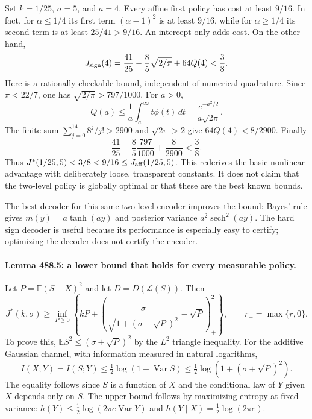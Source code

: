 \documentclass[11pt]{article}
\begin{document}
Set $k=1/25$, $\sigma=5$, and $a=4$. Every affine first policy has
cost at least $9/16$. In fact, for $\alpha\le1/4$ its first term
$(\alpha-1)^2$ is at least $9/16$, while for $\alpha\ge1/4$ its
second term is at least $25/41>9/16$. An intercept only adds cost.
On the other hand,
\[
 J_{\rm sign}(4)=\frac{41}{25}-\frac85\sqrt{2/\pi}+64Q(4)
                                      <\frac38.
\]
Here is a rationally checkable bound, independent of numerical quadrature.
Since $\pi<22/7$, one has $\sqrt{2/\pi}>797/1000$.
For $a>0$,
\[
 Q(a)\le\frac1a\int_a^\infty t\phi(t)\,dt
                  =\frac{e^{-a^2/2}}{a\sqrt{2\pi}}.
\]
The finite sum $\sum_{j=0}^{14}8^j/j!>2900$ and $\sqrt{2\pi}>2$
give $64Q(4)<8/2900$. Finally
\[
 \frac{41}{25}-\frac85\frac{797}{1000}+\frac8{2900}<\frac38.
\]
Thus $J^*(1/25,5)<3/8<9/16\le J_{\rm aff}(1/25,5)$.
This rederives the basic nonlinear advantage with deliberately loose,
transparent constants. It does not claim that the two-level policy is
globally optimal or that these are the best known bounds.

The best decoder for this same two-level encoder improves the bound:
Bayes' rule gives $m(y)=a\tanh(ay)$ and posterior variance
$a^2\operatorname{sech}^2(ay)$. The hard sign decoder is useful because
its performance is especially easy to certify; optimizing the decoder
does not certify the encoder.

\paragraph{Lemma 488.5: a lower bound that holds for every measurable policy.}
Let $P=\mathbb E(S-X)^2$ and let $D=D(\mathcal L(S))$. Then
\begin{equation}\label{a488:lower}
 J^*(k,\sigma)\ge\inf_{P\ge0}
 \left\{kP+
  \left(\frac{\sigma}{\sqrt{1+(\sigma+\sqrt P)^2}}-\sqrt P\right)_+^2
 \right\},\qquad r_+=\max\{r,0\}.
\end{equation}
To prove this, $\mathbb ES^2\le(\sigma+\sqrt P)^2$ by the $L^2$
triangle inequality. For the additive Gaussian channel, with information
measured in natural logarithms,
\[
 I(X;Y)=I(S;Y)\le\tfrac12\log(1+\operatorname{Var}S)
                         \le\tfrac12\log(1+(\sigma+\sqrt P)^2).
\]
The equality follows since $S$ is a function of $X$ and the conditional
law of $Y$ given $X$ depends only on $S$. The upper bound follows by
maximizing entropy at fixed variance: $h(Y)\le\frac12\log(2\pi e
\operatorname{Var}Y)$ and $h(Y\mid X)=\frac12\log(2\pi e)$.
\end{document}
